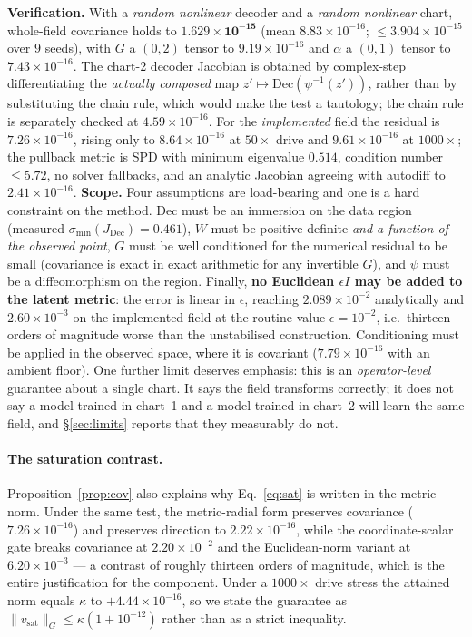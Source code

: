 \documentclass{article}
\newcommand{\Dec}{\mathrm{Dec}}
\newcommand{\ie}{i.e.\ }
\begin{document}
\noindent\textbf{Verification.} With a \emph{random nonlinear} decoder and a \emph{random
nonlinear} chart, whole-field covariance holds to $\mathbf{1.629\times10^{-15}}$ (mean
$8.83\times10^{-16}$; $\le 3.904\times10^{-15}$ over $9$ seeds), with $G$ a $(0,2)$ tensor to
$9.19\times10^{-16}$ and $\alpha$ a $(0,1)$ tensor to $7.43\times10^{-16}$. The chart-2
decoder Jacobian is obtained by complex-step differentiating the \emph{actually composed} map
$z' \mapsto \Dec(\psi^{-1}(z'))$, rather than by substituting the chain rule, which would make
the test a tautology; the chain rule is separately checked at $4.59\times10^{-16}$. For the
\emph{implemented} field the residual is $7.26\times10^{-16}$, rising only to
$8.64\times10^{-16}$ at $50\times$ drive and $9.61\times10^{-16}$ at $1000\times$; the
pullback metric is SPD with minimum eigenvalue $0.514$, condition number $\le 5.72$, no
solver fallbacks, and an analytic Jacobian agreeing with autodiff to $2.41\times10^{-16}$.
\textbf{Scope.} Four assumptions are load-bearing and one is a hard constraint on the
method. $\Dec$ must be an immersion on the data region (measured
$\sigma_{\min}(J_{\Dec}) = 0.461$), $W$ must be positive definite \emph{and a function of the
observed point}, $G$ must be well conditioned for the numerical residual to be small
(covariance is exact in exact arithmetic for any invertible $G$), and $\psi$ must be a
diffeomorphism on the region. Finally, \textbf{no Euclidean $\epsilon I$ may be added to the
latent metric}: the error is linear in $\epsilon$, reaching $2.089\times10^{-2}$ analytically
and $2.60\times10^{-3}$ on the implemented field at the routine value $\epsilon = 10^{-2}$,
\ie thirteen orders of magnitude worse than the unstabilised construction. Conditioning must
be applied in the observed space, where it is covariant ($7.79\times10^{-16}$ with an ambient
floor). One further limit deserves emphasis: this is an \emph{operator-level} guarantee about
a single chart. It says the field transforms correctly; it does not say a model trained in
chart~1 and a model trained in chart~2 will learn the same field, and \S\ref{sec:limits}
reports that they measurably do not.

\paragraph{The saturation contrast.} Proposition~\ref{prop:cov} also explains why
Eq.~\ref{eq:sat} is written in the metric norm. Under the same test, the metric-radial form
preserves covariance ($7.26\times10^{-16}$) and preserves direction to
$2.22\times10^{-16}$, while the coordinate-scalar gate breaks covariance at
$2.20\times10^{-2}$ and the Euclidean-norm variant at $6.20\times10^{-3}$ --- a contrast of
roughly thirteen orders of magnitude, which is the entire justification for the component.
Under a $1000\times$ drive stress the attained norm equals $\kappa$ to
$+4.44\times10^{-16}$, so we state the guarantee as
$\|v_{\mathrm{sat}}\|_{G} \le \kappa(1 + 10^{-12})$ rather than as a strict inequality.
\end{document}
